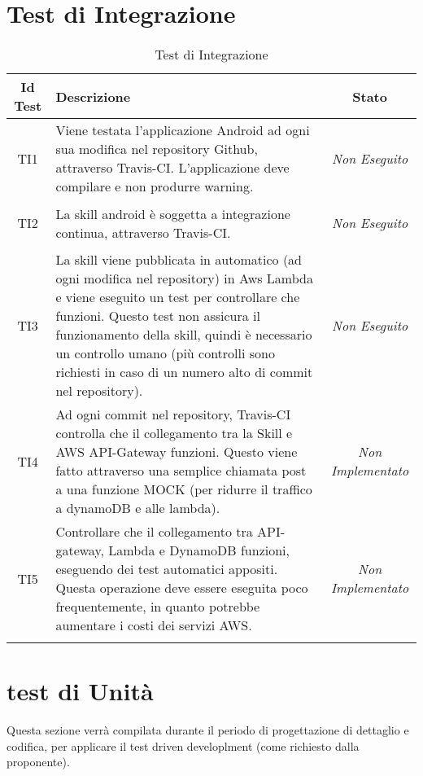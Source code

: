 \section{Test di Integrazione}
\normalsize
\begin{longtable}{|c|>{}m{8cm}|c|}
\hline 
\textbf{Id Test} & \textbf{Descrizione} & \textbf{Stato}\\
\hline
\endhead
\hypertarget{TI1}{TI1} & Viene testata l'applicazione Android ad ogni sua modifica nel repository Github, attraverso Travis-CI. L'applicazione deve compilare e non produrre warning. & \textit{Non Eseguito}\\ \hline
\hypertarget{TI2}{TI2} & La skill android è soggetta a integrazione continua, attraverso Travis-CI. & \textit{Non Eseguito}\\ \hline
\hypertarget{TI3}{TI3} & La skill viene pubblicata in automatico (ad ogni modifica nel repository) in Aws Lambda e viene eseguito un test per controllare che funzioni. Questo test non assicura il funzionamento della skill, quindi è necessario un controllo umano (più controlli sono richiesti in caso di un numero alto di commit nel repository). & \textit{Non Eseguito}\\ \hline
\hypertarget{TI4}{TI4} & Ad ogni commit nel repository, Travis-CI controlla che il collegamento tra la Skill e AWS API-Gateway funzioni. Questo viene fatto attraverso una semplice chiamata post a una funzione MOCK (per ridurre il traffico a dynamoDB e alle lambda). & \textit{Non Implementato}\\ \hline
\hypertarget{TI5}{TI5} & Controllare che il collegamento tra API-gateway, Lambda e DynamoDB funzioni, eseguendo dei test automatici appositi. Questa operazione deve essere eseguita poco frequentemente, in quanto potrebbe aumentare i costi dei servizi AWS. & \textit{Non Implementato}\\ \hline
\caption[Test di Integrazione]{Test di Integrazione}
\label{tabella:test2}
\end{longtable}
\clearpage

\section{test di Unità}
Questa sezione verrà compilata durante il periodo di progettazione di dettaglio e codifica, per applicare il test driven developlment (come richiesto dalla proponente).